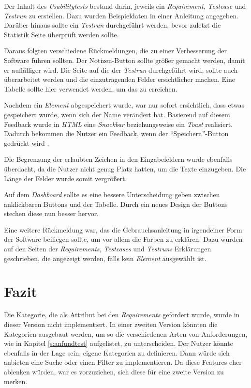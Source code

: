\documentclass[11pt,a4paper]{report}
\begin{document}
Der Inhalt des \textit{Usabilitytests} bestand darin, jeweils ein \textit{Requirement}, \textit{Testcase} und \textit{Testrun} zu erstellen. Dazu wurden Beispieldaten in einer Anleitung angegeben. Darüber hinaus sollte ein \textit{Testrun} durchgeführt werden, bevor zuletzt die Statistik Seite überprüft werden sollte.

Daraus folgten verschiedene Rückmeldungen, die zu einer Verbesserung der Software führen sollten. Der Notizen-Button sollte größer gemacht werden, damit er auffälliger wird. Die Seite auf die der \textit{Testrun} durchgeführt wird, sollte auch überarbeitet werden und die einzutragenden Felder ersichtlicher machen. Eine Tabelle sollte hier verwendet werden, um das zu erreichen.


Nachdem ein \textit{Element} abgespeichert wurde, war nur sofort ersichtlich, dass etwas gespeichert wurde, wenn sich der Name verändert hat. Basierend auf diesem Feedback wurde in \textit{HTML} eine \textit{Snackbar} beziehungsweise ein \textit{Toast} realisiert. Dadurch bekommen die Nutzer ein Feedback, wenn der "`Speichern"'-Button gedrückt wird \cite{snack}.

Die Begrenzung der erlaubten Zeichen in den Eingabefeldern wurde ebenfalls überdacht, da die Nutzer nicht genug Platz hatten, um die Texte einzugeben. Die Länge der Felder wurde somit vergrößert.

Auf dem \textit{Dashboard} sollte es eine bessere Unterscheidung geben zwischen anklickbaren Buttons und der Tabelle. Durch ein neues Design der Buttons stechen diese nun besser hervor.

Eine weitere Rückmeldung war, das die Gebrauchsanleitung in irgendeiner Form der Software beiliegen sollte, um vor allem die Farben zu erklären. Dazu wurden auf den Seiten der \textit{Requirements}, \textit{Testcases} und \textit{Testruns} Erklärungen geschrieben, die angezeigt werden, falls kein \textit{Element} ausgewählt ist.




\chapter{Fazit} \label{chap:fazit}

Die Kategorie, die als Attribut bei den \textit{Requirements} gefordert wurde, wurde in dieser Version nicht implementiert. In einer zweiten Version könnten die Kategorien ausgebaut werden, um so die verschiedenen Arten von Anforderungen, wie in Kapitel \ref{s:anfundtest} aufgelistet, zu unterscheiden. Der Nutzer könnte ebenfalls in der Lage sein, eigene Kategorien zu definieren. Dann würde sich anbieten eine Suche oder einen Filter zu implementieren. Da diese Features eher ablenken würden, war es vorzuziehen, sich diese für eine zweite Version zu merken.
\end{document}
